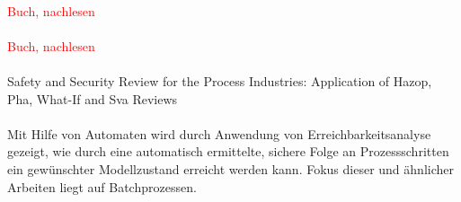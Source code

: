 \paragraph*{\cite{ChemicalProcessSafety_2013}} \textcolor{red}{Buch, nachlesen}
\paragraph*{\cite{ChemicalProcessSafety_2015}} \textcolor{red}{Buch, nachlesen}

\paragraph*{\cite{Nolan_2014}} Safety and Security Review for the Process Industries: Application of Hazop, Pha, What-If and Sva Reviews

\paragraph*{\cite{Cochard_2015}}
Mit Hilfe von Automaten wird durch Anwendung von Erreichbarkeitsanalyse gezeigt, wie durch eine automatisch ermittelte, sichere Folge an Prozessschritten ein gew\"unschter Modellzustand erreicht werden kann. Fokus dieser und \"ahnlicher Arbeiten liegt auf Batchprozessen.  \hfill \newline
